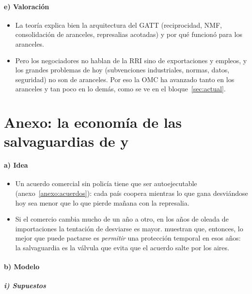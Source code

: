 \documentclass[11pt]{article}
\begin{document}
\paragraph{e) Valoración}

\begin{itemize}
\item La teoría explica bien la arquitectura del GATT (reciprocidad, NMF, consolidación de aranceles, represalias acotadas) y por qué funcionó para los aranceles.
\item Pero los negociadores no hablan de la RRI sino de exportaciones y empleos, y los grandes problemas de hoy (subvenciones industriales, normas, datos, seguridad) no son de aranceles. Por eso la OMC ha avanzado tanto en los aranceles y tan poco en lo demás, como se ve en el bloque~\ref{sec:actual}.
\end{itemize}

\section{Anexo: la economía de las salvaguardias\cortetitulo{} de  y }\label{anexo:salvaguardias}

\paragraph{a) Idea}

\begin{itemize}
\item Un acuerdo comercial sin policía tiene que ser autoejecutable (anexo~\ref{anexo:acuerdos}): cada país coopera mientras lo que gana desviándose hoy sea menor que lo que pierde mañana con la represalia.
\item Si el comercio cambia mucho de un año a otro, en los años de oleada de importaciones la tentación de desviarse es mayor. \textcite{BagwellStaiger1990Managed} muestran que, entonces, lo mejor que puede pactarse es \emph{permitir} una protección temporal en esos años: la salvaguardia es la válvula que evita que el acuerdo salte por los aires.
\end{itemize}

\paragraph{b) Modelo}

\subparagraph{i) Supuestos}
\end{document}
